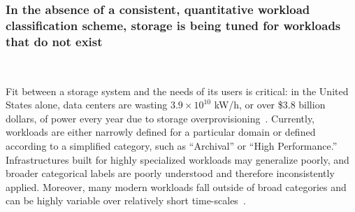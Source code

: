 



\subsubsection*{In the absence of a consistent, quantitative workload classification scheme, storage is being tuned for workloads that do not exist}\

Fit between a storage system and the needs of its users is critical: in the United States alone, data centers are wasting
$3.9\times10^{10}$ kW/h, or over \$3.8 billion dollars, of power every year due
to storage overprovisioning~\cite{nrdc}. Currently, workloads are either narrowly defined for a particular domain or
defined according to a simplified category, such as ``Archival'' or ``High
Performance.'' Infrastructures built for highly specialized workloads may
generalize poorly, and broader categorical labels are poorly understood and therefore
inconsistently applied. Moreover, many modern workloads fall outside of broad
categories and can be highly variable over relatively short
time-scales~\cite{google_dist_store_2015}.


%







